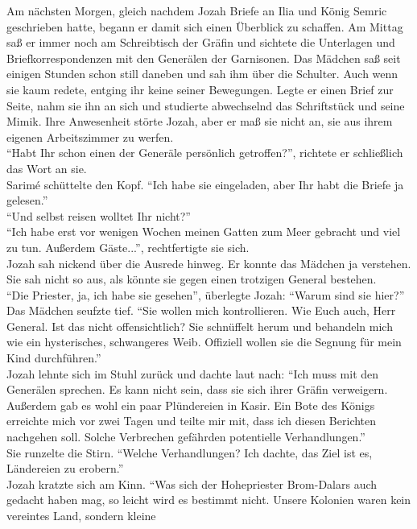 Am nächsten Morgen, gleich nachdem Jozah Briefe an Ilia und König Semric geschrieben hatte, begann 
er damit sich einen Überblick zu schaffen. Am Mittag saß er immer noch am Schreibtisch der 
Gräfin und sichtete die Unterlagen und Briefkorrespondenzen mit den Generälen der Garnisonen. Das 
Mädchen saß seit einigen Stunden schon still daneben und sah ihm über die Schulter. Auch wenn sie 
kaum redete, entging ihr keine seiner Bewegungen. Legte er einen Brief zur Seite, nahm sie ihn an 
sich und studierte abwechselnd das Schriftstück und seine Mimik. Ihre Anwesenheit störte Jozah, 
aber er maß sie nicht an, sie aus ihrem eigenen Arbeitszimmer zu werfen.\\
``Habt Ihr schon einen der Generäle persönlich getroffen?'', richtete er schließlich das Wort an 
sie.\\
Sarimé schüttelte den Kopf. ``Ich habe sie eingeladen, aber Ihr habt die Briefe ja gelesen.''\\
``Und selbst reisen wolltet Ihr nicht?''\\
``Ich habe erst vor wenigen Wochen meinen Gatten zum Meer gebracht und viel zu tun. Außerdem 
Gäste...'', rechtfertigte sie sich.\\
Jozah sah nickend über die Ausrede hinweg. Er konnte das Mädchen ja verstehen. Sie sah nicht so 
aus, als könnte sie gegen einen trotzigen General bestehen.\\
``Die Priester, ja, ich habe sie gesehen'', überlegte Jozah: ``Warum sind sie hier?''\\
Das Mädchen seufzte tief. ``Sie wollen mich kontrollieren. Wie Euch auch, Herr General. Ist das 
nicht offensichtlich? Sie schnüffelt herum und behandeln mich wie ein hysterisches, schwangeres 
Weib. Offiziell wollen sie die Segnung für mein Kind durchführen.''\\
Jozah lehnte sich im Stuhl zurück und dachte laut nach: ``Ich muss mit den Generälen sprechen. Es 
kann nicht sein, dass sie sich ihrer Gräfin verweigern. Außerdem gab es wohl ein paar Plündereien in 
Kasir. Ein Bote des Königs erreichte mich vor zwei Tagen und teilte mir mit, dass ich diesen 
Berichten nachgehen soll. Solche Verbrechen gefährden potentielle Verhandlungen.''\\
Sie runzelte die Stirn. ``Welche Verhandlungen? Ich dachte, das Ziel ist es, Ländereien zu 
erobern.''\\
Jozah kratzte sich am Kinn. ``Was sich der Hohepriester Brom-Dalars auch gedacht haben mag, so 
leicht wird es bestimmt nicht. Unsere Kolonien waren kein vereintes Land, sondern kleine 
